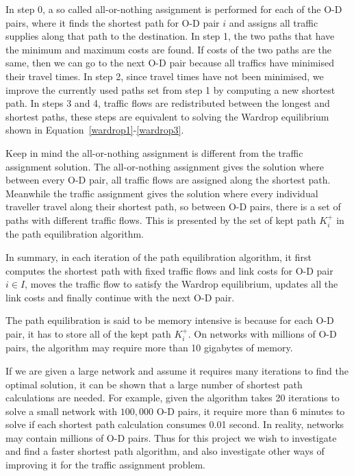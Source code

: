 In step 0, a so called all-or-nothing assignment is performed for each of the O-D pairs,
where it finds the shortest path for O-D pair $i$ and assigns all traffic supplies along that path to the destination.
In step 1, the two paths that have the minimum and maximum costs are found.
If costs of the two paths are the same, then we can go to the next O-D pair because all traffics have minimised their travel times.
In step 2, since travel times have not been minimised, we improve the currently used paths set from step 1 by computing a new shortest path.
In steps 3 and 4, traffic flows are redistributed between the longest and shortest paths, these steps are equivalent to solving the Wardrop equilibrium shown in Equation~\eqref{wardrop1}-\eqref{wardrop3}.

Keep in mind the all-or-nothing assignment is different from the traffic assignment solution.
The all-or-nothing assignment gives the solution where between every O-D pair,
all traffic flows are assigned along the shortest path.
Meanwhile the traffic assignment gives the solution where every individual traveller travel along their shortest path,
so between O-D pairs, there is a set of paths with different traffic flows.
This is presented by the set of kept path $K_i^+$ in the path equilibration algorithm.

In summary, in each iteration of the path equilibration algorithm,
it first computes the shortest path with fixed traffic flows and link costs for O-D pair $i \in I$, moves the traffic flow to satisfy the Wardrop equilibrium,
updates all the link costs and finally continue with the next O-D pair.

The path equilibration is said to be memory intensive is because for each O-D pair, it has to store all of the kept path $K_i^+$.
On networks with millions of O-D pairs, the algorithm may require more than 10 gigabytes of memory.

If we are given a large network and assume it requires many iterations to find the optimal solution,
it can be shown that a large number of shortest path calculations are needed.
For example, 
given the algorithm takes 20 iterations to solve a small network with $100,000$ O-D pairs,
it require more than 6 minutes to solve if
each shortest path calculation consumes 0.01 second.
In reality,
networks may contain millions of O-D pairs.
Thus for this project we wish to
investigate and find a faster shortest path algorithm,
and also investigate other ways of improving it for the traffic assignment problem.

